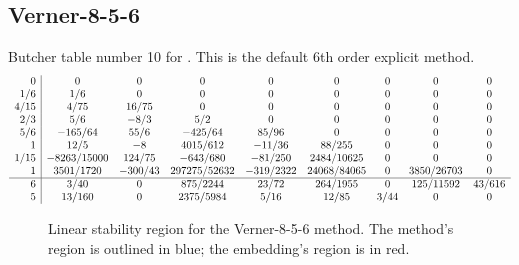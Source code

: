 \documentclass[letterpaper,10pt,english]{sphinxmanual}
\begin{document}
\subsection{Verner-8-5-6}
\label{Butcher:butcher-verner-6-5}\label{Butcher:verner-8-5-6}
Butcher table number 10
for {\hyperref[c_interface/User_callable:c.ARKodeSetERKTableNum]{\emph{}}}.  This is
the default 6th order explicit method.
\begin{gather}
\begin{split}\begin{array}{r|cccccccc}
  0 & 0 & 0 & 0 & 0 & 0 & 0 & 0 & 0 \\
  1/6 & 1/6 & 0 & 0 & 0 & 0 & 0 & 0 & 0 \\
  4/15 & 4/75 & 16/75 & 0 & 0 & 0 & 0 & 0 & 0 \\
  2/3 & 5/6 & -8/3 & 5/2 & 0 & 0 & 0 & 0 & 0 \\
  5/6 & -165/64 & 55/6 & -425/64 & 85/96 & 0 & 0 & 0 & 0 \\
  1 & 12/5 & -8 & 4015/612 & -11/36 & 88/255 & 0 & 0 & 0 \\
  1/15 & -8263/15000 & 124/75 & -643/680 & -81/250 & 2484/10625 & 0 & 0 & 0 \\
  1 & 3501/1720 & -300/43 & 297275/52632 & -319/2322 & 24068/84065 & 0 & 3850/26703 & 0 \\
  \hline
  6 & 3/40 & 0 & 875/2244 & 23/72 & 264/1955 & 0 & 125/11592 & 43/616 \\
  5 & 13/160 & 0 & 2375/5984 & 5/16 & 12/85 & 3/44 & 0 & 0
\end{array}\end{split}\notag
\end{gather}\begin{figure}[htbp]
\centering
\capstart

\caption{Linear stability region for the Verner-8-5-6 method.  The method's
region is outlined in blue; the embedding's region is in red.}\end{figure}
\end{document}
